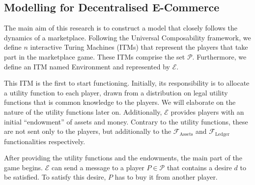 \subsection{Modelling for Decentralised E-Commerce}
  The main aim of this research is to construct a model that closely follows the dynamics
  of a marketplace. Following the Universal Composability framework, we define $n$
  interactive Turing Machines (ITMs) that represent the players that take part in the
  marketplace game. These ITMs comprise the set $\mathcal{P}$. Furthermore, we define an
  ITM named Environment and represented by $\mathcal{E}$.

  This ITM is the first to start functioning. Initially, its responsibility is to allocate
  a utility function to each player, drawn from a distribution on legal utility functions
  that is common knowledge \cite{knowledge} to the players. We will elaborate on the
  nature of the utility functions later on. Additionally, $\mathcal{E}$ provides players
  with an initial ``endowment'' of assets and money. Contrary to the utility functions,
  these are not sent only to the players, but additionally to the
  $\mathcal{F}_{\mathrm{Assets}}$ and $\mathcal{F}_{\mathrm{Ledger}}$ functionalities
  respectively.

  After providing the utility functions and the endowments, the main part of the game
  begins. $\mathcal{E}$ can send a message to a player $P \in \mathcal{P}$ that contains a
  desire $d$ to be satisfied. To satisfy this desire, $P$ has to buy it from another
  player.

